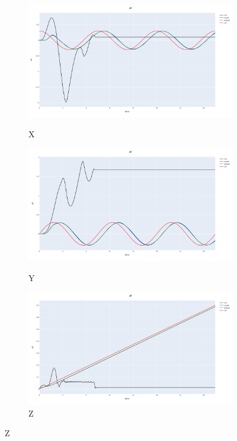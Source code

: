 \documentclass[../templateLTHtwocol.tex]{subfiles}
\begin{document}
\begin{figure}[H]
	\centering
	\caption{Helix Test Results in Gym-Pybullet-Drones}
	\begin{subfigure}[b]{0.2\textwidth}
		\caption{X}
		\includegraphics[width=\textwidth]{resources/pid/x0.png}
		\label{fig:figpid1}
	\end{subfigure}
	\hfill
	\begin{subfigure}[b]{0.2\textwidth}
		\caption{Y}
		\includegraphics[width=\textwidth]{resources/pid/y0.png}
		\label{fig:figpid2}
	\end{subfigure}
	\hfill
	\begin{subfigure}[b]{0.2\textwidth}
		\caption{Z}
		\includegraphics[width=\textwidth]{resources/pid/z0.png}

\end{subfigure}
\end{figure}
\end{document}
